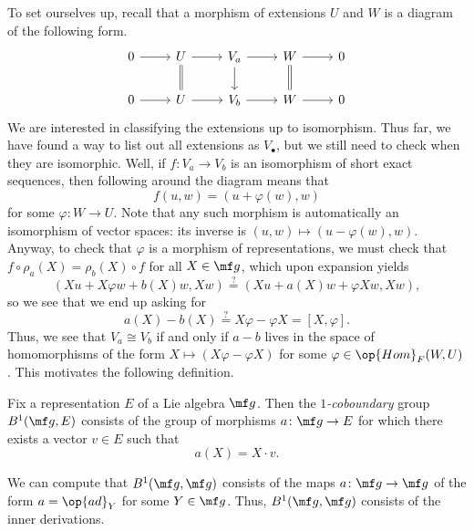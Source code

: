 \documentclass[../notes.tex]{subfiles}
\begin{document}
To set ourselves up, recall that a morphism of extensions $U$ and $W$ is a diagram of the following form.
\[\begin{tikzcd}
	0 & U & {V_a} & W & 0 \\
	0 & U & {V_b} & W & 0
	\arrow[from=1-1, to=1-2]
	\arrow[from=1-2, to=1-3]
	\arrow[Rightarrow, no head, from=1-2, to=2-2]
	\arrow[from=1-3, to=1-4]
	\arrow[from=1-3, to=2-3]
	\arrow[from=1-4, to=1-5]
	\arrow[Rightarrow, no head, from=1-4, to=2-4]
	\arrow[from=2-1, to=2-2]
	\arrow[from=2-2, to=2-3]
	\arrow[from=2-3, to=2-4]
	\arrow[from=2-4, to=2-5]
\end{tikzcd}\]
We are interested in classifying the extensions up to isomorphism. Thus far, we have found a way to list out all extensions as $V_\bullet$, but we still need to check when they are isomorphic. Well, if $f\colon V_a\to V_b$ is an isomorphism of short exact sequences, then following around the diagram means that
\[f(u,w)=(u+\varphi(w),w)\]
for some $\varphi\colon W\to U$. Note that any such morphism is automatically an isomorphism of vector spaces: its inverse is $(u,w)\mapsto(u-\varphi(w),w)$. Anyway, to check that $\varphi$ is a morphism of representations, we must check that $f\circ\rho_a(X)=\rho_b(X)\circ f$ for all $X\in\mf g$, which upon expansion yields
\[(Xu+X\varphi w+b(X)w,Xw)\stackrel?=(Xu+a(X)w+\varphi Xw,Xw),\]
so we see that we end up asking for
\[a(X)-b(X)\stackrel?=X\varphi-\varphi X=[X,\varphi].\]
Thus, we see that $V_a\cong V_b$ if and only if $a-b$ lives in the space of homomorphisms of the form $X\mapsto(X\varphi-\varphi X)$ for some $\varphi\in\op{Hom}_F(W,U)$. This motivates the following definition.
\begin{defihelper}[$B^1(\mf g,E)$] 
	Fix a representation $E$ of a Lie algebra $\mf g$. Then the \textit{$1$-coboundary} group $B^1(\mf g,E)$ consists of the group of morphisms $a\colon\mf g\to E$ for which there exists a vector $v\in E$ such that
	\[a(X)=X\cdot v.\]
\end{defihelper}
\begin{example}
	We can compute that $B^1(\mf g,\mf g)$ consists of the maps $a\colon\mf g\to\mf g$ of the form $a=\op{ad}_Y$ for some $Y\in\mf g$. Thus, $B^1(\mf g,\mf g)$ consists of the inner derivations.
\end{example}
\end{document}
